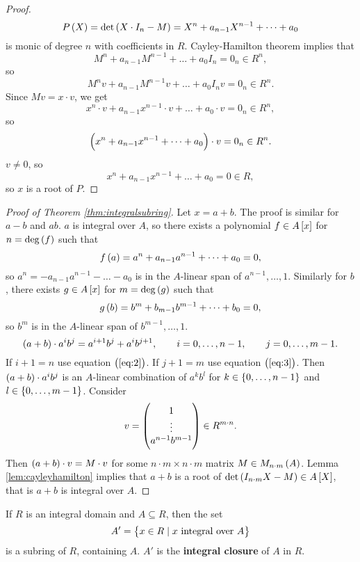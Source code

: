 \begin{proof}
$$ P\br{X} = \det\br{X \cdot I_n - M} = X^n + a_{n - 1}X^{n - 1} + \dots + a_0 $$
is monic of degree $ n $ with coefficients in $ R $. Cayley-Hamilton theorem implies that
$$ M^n + a_{n - 1}M^{n - 1} + \dots + a_0I_n = 0_n \in R^n, $$
so
$$ M^nv + a_{n - 1}M^{n - 1}v + \dots + a_0I_nv = 0_n \in R^n. $$
Since $ Mv = x \cdot v $, we get
$$ x^n \cdot v + a_{n - 1}x^{n - 1} \cdot v + \dots + a_0 \cdot v = 0_n \in R^n, $$
so
$$ \br{x^n + a_{n - 1}x^{n - 1} + \dots + a_0} \cdot v = 0_n \in R^n. $$
$ v \ne 0 $, so
$$ x^n + a_{n - 1}x^{n - 1} + \dots + a_0 = 0 \in R, $$
so $ x $ is a root of $ P $.
\end{proof}

\pagebreak

\begin{proof}[Proof of Theorem \ref{thm:integralsubring}]
Let $ x = a + b $. The proof is similar for $ a - b $ and $ ab $. $ a $ is integral over $ A $, so there exists a polynomial $ f \in A\sbr{x} $ for $ n = \deg\br{f} $ such that
\begin{equation}
\label{eq:2}
f\br{a} = a^n + a_{n - 1}a^{n - 1} + \dots + a_0 = 0,
\end{equation}
so $ a^n = -a_{n - 1}a^{n - 1} - \dots - a_0 $ is in the $ A $-linear span of $ a^{n - 1}, \dots, 1 $. Similarly for $ b $, there exists $ g \in A\sbr{x} $ for $ m = \deg\br{g} $ such that
\begin{equation}
\label{eq:3}
g\br{b} = b^m + b_{m - 1}b^{m - 1} + \dots + b_0 = 0,
\end{equation}
so $ b^m $ is in the $ A $-linear span of $ b^{m - 1}, \dots, 1 $.
$$ \br{a + b} \cdot a^ib^j = a^{i + 1}b^j + a^ib^{j + 1}, \qquad i = 0, \dots, n - 1, \qquad j = 0, \dots, m - 1. $$
If $ i + 1 = n $ use equation $ \br{\ref{eq:2}} $. If $ j + 1 = m $ use equation $ \br{\ref{eq:3}} $. Then $ \br{a + b} \cdot a^ib^j $ is an $ A $-linear combination of $ a^kb^l $ for $ k \in \cbr{0, \dots, n - 1} $ and $ l \in \cbr{0, \dots, m - 1} $. Consider
$$ v = \begin{pmatrix} 1 \\ \vdots \\ a^{n - 1}b^{m - 1} \end{pmatrix} \in R^{m \cdot n}. $$
Then $ \br{a + b} \cdot v = M \cdot v $ for some $ n \cdot m \times n \cdot m $ matrix $ M \in M_{n \cdot m}\br{A} $. Lemma \ref{lem:cayleyhamilton} implies that $ a + b $ is a root of $ \det\br{I_{n \cdot m}X - M} \in A\sbr{X} $, that is $ a + b $ is integral over $ A $.
\end{proof}

\begin{corollary}
If $ R $ is an integral domain and $ A \subseteq R $, then the set
$$ A' = \cbr{x \in R \mid x \ \text{integral over} \ A} $$
is a subring of $ R $, containing $ A $. $ A' $ is the \textbf{integral closure} of $ A $ in $ R $.
\end{corollary}

